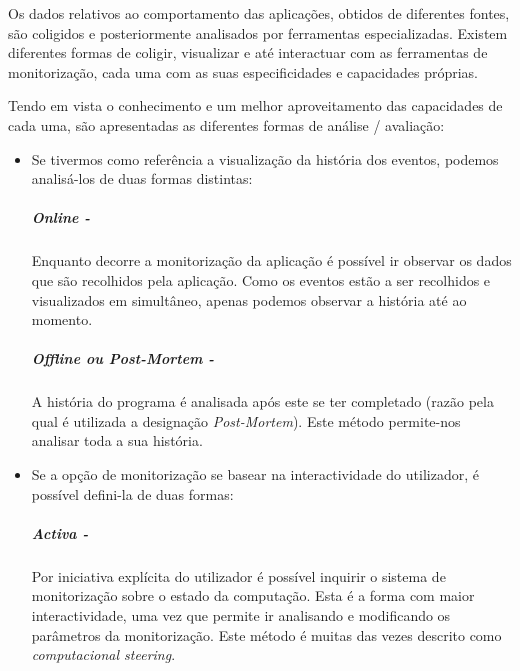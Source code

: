 Os dados relativos ao comportamento das aplicações, obtidos de diferentes fontes, são coligidos e posteriormente analisados por ferramentas especializadas.
Existem diferentes formas de coligir, visualizar e até interactuar com as ferramentas de monitorização, cada uma com as suas especificidades e capacidades próprias.

Tendo em vista o conhecimento e um melhor aproveitamento das capacidades de cada uma, são apresentadas as diferentes formas de análise / avaliação:

\begin{itemize}
 \item 


Se tivermos como referência a visualização da história dos eventos, podemos analisá-los de duas formas distintas:
\subparagraph*{Online - }
Enquanto decorre a monitorização da aplicação é possível ir observar os dados que são recolhidos pela aplicação.
Como os eventos estão a ser recolhidos e visualizados em simultâneo, apenas podemos observar a história até ao momento.

\subparagraph*{Offline ou \textit{Post-Mortem} - }
A história do programa é analisada após este se ter completado (razão pela qual é utilizada a designação \textit{Post-Mortem}).
Este método permite-nos analisar toda a sua história.

\item

Se a opção de monitorização se basear na interactividade do utilizador, é possível defini-la de duas formas:

\subparagraph*{Activa - }

Por iniciativa explícita do utilizador é possível inquirir o sistema de monitorização sobre o estado da computação.
Esta é a forma com maior interactividade, uma vez que permite ir analisando e modificando os parâmetros da monitorização.
Este método é muitas das vezes descrito como \textit{computacional steering}.



\end{itemize}
